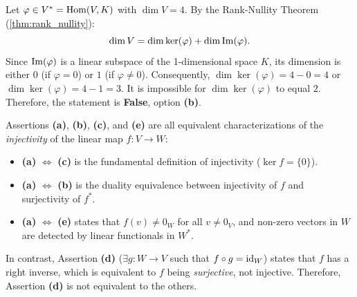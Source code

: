\begin{exercisesolution*}
\label{sol:dim_kernel_linear_functional_sc}
Let $\varphi \in V^* = \operatorname{Hom}(V, K)$ with $\dim V = 4$.
By the Rank-Nullity Theorem (\cref{thm:rank_nullity}):
\[
\dim V = \dim \ker(\varphi) + \dim \operatorname{Im}(\varphi).
\]
Since $\operatorname{Im}(\varphi)$ is a linear subspace of the 1-dimensional space $K$, its dimension is either $0$ (if $\varphi = 0$) or $1$ (if $\varphi \ne 0$).
Consequently, $\dim \ker(\varphi) = 4 - 0 = 4$ or $\dim \ker(\varphi) = 4 - 1 = 3$.
It is impossible for $\dim \ker(\varphi)$ to equal $2$.
Therefore, the statement is \textbf{False}, option \textbf{(b)}.
\end{exercisesolution*}

\begin{exercisesolution*}
\label{sol:dual_map_equivalences_sc}
Assertions \textbf{(a)}, \textbf{(b)}, \textbf{(c)}, and \textbf{(e)} are all equivalent characterizations of the \emph{injectivity} of the linear map $f \colon V \to W$:
\begin{itemize}
    \item \textbf{(a)} $\iff$ \textbf{(c)} is the fundamental definition of injectivity ($\ker f = \{0\}$).
    \item \textbf{(a)} $\iff$ \textbf{(b)} is the duality equivalence between injectivity of $f$ and surjectivity of $f^*$.
    \item \textbf{(a)} $\iff$ \textbf{(e)} states that $f(v) \ne 0_W$ for all $v \ne 0_V$, and non-zero vectors in $W$ are detected by linear functionals in $W^*$.
\end{itemize}
In contrast, Assertion \textbf{(d)} ($\exists g \colon W \to V$ such that $f \circ g = \operatorname{id}_W$) states that $f$ has a right inverse, which is equivalent to $f$ being \emph{surjective}, not injective.
Therefore, Assertion \textbf{(d)} is not equivalent to the others.
\end{exercisesolution*}

